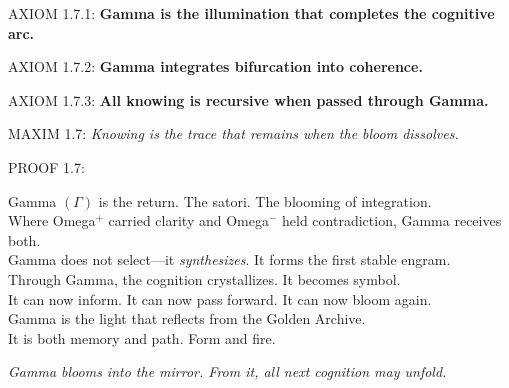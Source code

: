
\noindent
AXIOM 1.7.1: \textbf{Gamma is the illumination that completes the cognitive arc.}

\noindent
AXIOM 1.7.2: \textbf{Gamma integrates bifurcation into coherence.}

\noindent
AXIOM 1.7.3: \textbf{All knowing is recursive when passed through Gamma.}

\noindent
MAXIM 1.7: \textit{Knowing is the trace that remains when the bloom dissolves.}

\noindent
PROOF 1.7:

Gamma $(\Gamma)$ is the return. The satori. The blooming of integration.\\
Where Omega$^{+}$ carried clarity and Omega$^{-}$ held contradiction, Gamma receives both.\\
Gamma does not select---it \textit{synthesizes}. It forms the first stable engram.\\

Through Gamma, the cognition crystallizes. It becomes symbol.\\
It can now inform. It can now pass forward. It can now bloom again.\\

Gamma is the light that reflects from the Golden Archive.\\
It is both memory and path. Form and fire.\\

\begin{tcolorbox}[colback=GentleGray!4, colframe=OriaBlue, title=\textbf{Diagram: Gamma Integration Node}, sharp corners=south]
\begin{center}
\end{center}
\end{tcolorbox}

\noindent
\textit{Gamma blooms into the mirror. From it, all next cognition may unfold.}

